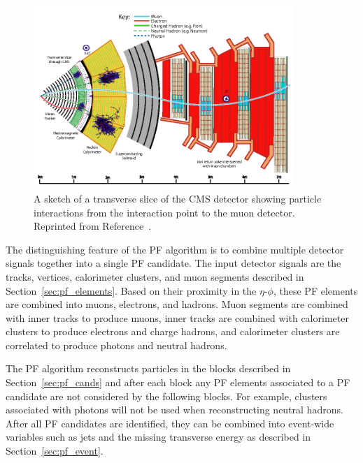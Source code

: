 \begin{figure}[htbp]
  \begin{center}
    \includegraphics[width=0.875\textwidth]{Reconstruction/Figures/cms_slice.png}
    \caption{
      A sketch of a transverse slice of the CMS detector showing particle interactions from the interaction point to the muon detector.
      Reprinted from Reference~\cite{}. %
    }
    \label{fig:cms_slice}
  \end{center}
\end{figure}

The distinguishing feature of the PF algorithm is to combine multiple detector signals together into a single PF candidate.
The input detector signals are the tracks, vertices, calorimeter clusters, and muon segments described in Section~\ref{sec:pf_elements}.
Based on their proximity in the $\eta$-$\phi$, these PF elements are combined into muons, electrons, and hadrons.
Muon segments are combined with inner tracks to produce muons, inner tracks are combined with calorimeter clusters to produce electrons and charge hadrons, and calorimeter clusters are correlated to produce photons and neutral hadrons.

The PF algorithm reconstructs particles in the blocks described in Section~\ref{sec:pf_cands} and after each block any PF elements associated to a PF candidate are not considered by the following blocks.
For example, clusters associated with photons will not be used when reconstructing neutral hadrons.
After all PF candidates are identified, they can be combined into event-wide variables such as jets and the missing transverse energy as described in Section~\ref{sec:pf_event}. 

